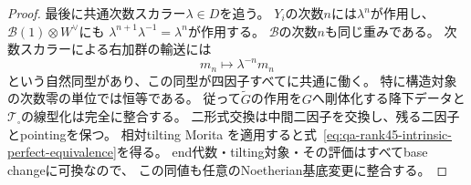 \begin{proof}
最後に共通次数スカラー$\lambda\in D$を追う。
$Y_i$の次数$n$には$\lambda^n$が作用し、
$\mathcal B(1)\otimes W^\vee$にも
$\lambda^{n+1}\lambda^{-1}=\lambda^n$が作用する。
$\mathcal B$の次数$n$も同じ重みである。
次数スカラーによる右加群の輸送には
\[
 m_n\longmapsto\lambda^{-n}m_n
\]
という自然同型があり、この同型が四因子すべてに共通に働く。
特に構造対象の次数零の単位では恒等である。
従って$\widetilde G$の作用を$G$へ剛体化する降下データと
$\mathcal T_\square$の線型化は完全に整合する。
二形式交換は中間二因子を交換し、残る二因子とpointingを保つ。
相対tilting Morita
\cite[Sections~8.2 and 9.2]{Keller1994}
を適用すると式~\eqref{eq:qa-rank45-intrinsic-perfect-equivalence}を得る。
end代数・tilting対象・その評価はすべてbase changeに可換なので、
この同値も任意のNoetherian基底変更に整合する。
\end{proof}

